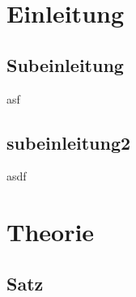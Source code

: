 \documentclass[10pt, a4paper]{article}
\begin{document}
\section{Einleitung}
\blindtext
\subsection{Subeinleitung} %
\label{sub:subeinleitung}
asf
\newpage
\subsection{subeinleitung2} %
\label{sub:subeinleitung2}
asdf
\newpage
\section{Theorie}
\blindtext
\subsection{Satz}
\blindtext

\blindtext

\blindtext

\blindtext
\end{document}
